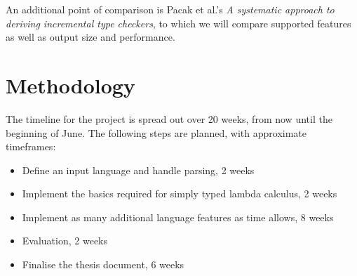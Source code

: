 \documentclass{article}
\begin{document}
An additional point of comparison is Pacak et al.'s \emph{A systematic approach to deriving incremental type checkers}, to which we will compare supported features as well as output size and performance.

\section{Methodology}

The timeline for the project is spread out over 20 weeks, from now until the beginning of June.
The following steps are planned, with approximate timeframes:
\begin{itemize}
  \item Define an input language and handle parsing, 2 weeks
  \item Implement the basics required for simply typed lambda calculus, 2 weeks
  \item Implement as many additional language features as time allows, 8 weeks
  \item Evaluation, 2 weeks
  \item Finalise the thesis document, 6 weeks %
\end{itemize}
\end{document}
